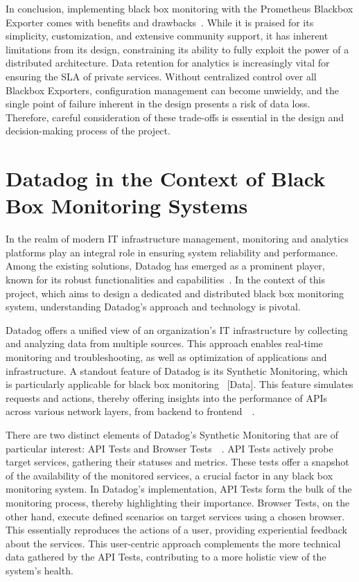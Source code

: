 In conclusion, implementing black box monitoring with the Prometheus Blackbox Exporter comes with benefits and drawbacks~\parencite{oreilly_spotlight_nodate}. While it is praised for its simplicity, customization, and extensive community support, it has inherent limitations from its design, constraining its ability to fully exploit the power of a distributed architecture. Data retention for analytics is increasingly vital for ensuring the \ac{SLA} of private services. Without centralized control over all Blackbox Exporters, configuration management can become unwieldy, and the single point of failure inherent in the design presents a risk of data loss. Therefore, careful consideration of these trade-offs is essential in the design and decision-making process of the project. 

\section{Datadog in the Context of Black Box Monitoring Systems}

In the realm of modern IT infrastructure management, monitoring and analytics platforms play an integral role in ensuring system reliability and performance. Among the existing solutions, Datadog has emerged as a prominent player, known for its robust functionalities and capabilities~\parencite{datadog_synthetic_nodate}. In the context of this project, which aims to design a dedicated and distributed black box monitoring system, understanding Datadog's approach and technology is pivotal. 

Datadog offers a unified view of an organization's IT infrastructure by collecting and analyzing data from multiple sources. This approach enables real-time monitoring and troubleshooting, as well as optimization of applications and infrastructure. A standout feature of Datadog is its Synthetic Monitoring, which is particularly applicable for black box monitoring~\parencite{datadog_synthetic_nodate} [Data]. This feature simulates requests and actions, thereby offering insights into the performance of APIs across various network layers, from backend to frontend~\parencite{datadog_api_nodate}~\parencite{datadog_browser_nodate}. 

There are two distinct elements of Datadog's Synthetic Monitoring that are of particular interest: API Tests and Browser Tests~\parencite{datadog_api_nodate}~\parencite{datadog_browser_nodate}. API Tests actively probe target services, gathering their statuses and metrics. These tests offer a snapshot of the availability of the monitored services, a crucial factor in any black box monitoring system. In Datadog's implementation, API Tests form the bulk of the monitoring process, thereby highlighting their importance. Browser Tests, on the other hand, execute defined scenarios on target services using a chosen browser. This essentially reproduces the actions of a user, providing experiential feedback about the services. This user-centric approach complements the more technical data gathered by the API Tests, contributing to a more holistic view of the system's health. 

